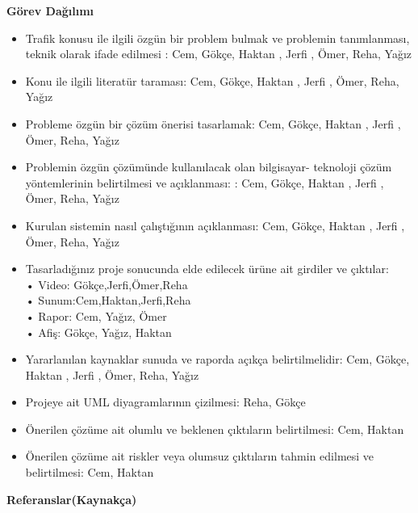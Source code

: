 \documentclass[12pt,a4paper]{report}
\begin{document}
{\large\bfseries Görev Dağılımı\\ \par}
\begin{itemize}
	\item Trafik konusu ile ilgili özgün bir problem bulmak ve problemin tanımlanması, teknik olarak ifade edilmesi : Cem, Gökçe, Haktan , Jerfi , Ömer, Reha, Yağız
	
	\item Konu ile ilgili literatür taraması: Cem, Gökçe, Haktan , Jerfi , Ömer, Reha, Yağız 
	
	\item Probleme özgün bir çözüm önerisi tasarlamak: Cem, Gökçe, Haktan , Jerfi , Ömer, Reha, Yağız
	
	\item Problemin özgün çözümünde kullanılacak olan bilgisayar- teknoloji çözüm yöntemlerinin belirtilmesi ve açıklanması: : Cem, Gökçe, Haktan , Jerfi , Ömer, Reha, Yağız
	
	\item Kurulan sistemin nasıl çalıştığının açıklanması: Cem, Gökçe, Haktan , Jerfi , Ömer, Reha, Yağız
	
	\item Tasarladığınız proje sonucunda elde edilecek ürüne ait girdiler ve çıktılar: \\
	•	Video: Gökçe,Jerfi,Ömer,Reha\\
	•	Sunum:Cem,Haktan,Jerfi,Reha\\
	•	Rapor: Cem, Yağız, Ömer\\
	•	Afiş: Gökçe, Yağız, Haktan\\
	
	\item Yararlanılan kaynaklar sunuda ve raporda açıkça belirtilmelidir: Cem, Gökçe, Haktan , Jerfi , Ömer, Reha, Yağız
	
	\item Projeye ait UML diyagramlarının çizilmesi: Reha, Gökçe
	
	\item Önerilen çözüme ait olumlu ve beklenen çıktıların belirtilmesi: Cem, Haktan
	
	\item  Önerilen çözüme ait riskler veya olumsuz çıktıların tahmin edilmesi ve belirtilmesi: Cem, Haktan
\end{itemize}

\newpage

{\large\bfseries Referanslar(Kaynakça) \\ \par}
\end{document}
